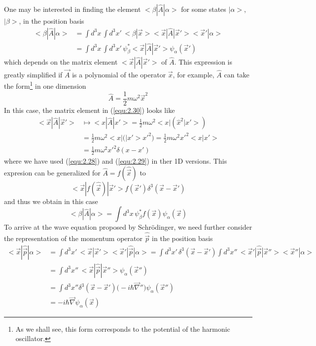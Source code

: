 One may be interested in finding the element
$<\beta|\hat{A}|\alpha>$ for some states $|\alpha>$,
$|\beta>$, in the position basis
\begin{align}
  <\beta|\hat{A}|\alpha> &= \int d^3 x\, \int d^3 x'\,
  <\beta|\vec{x}><\vec{x}|\hat{A}|\vec{x}'><\vec{x}'|\alpha>\nonumber\\
  &=\int d^3 x\, \int d^3 x'\,
  \psi_{\beta}^* <\vec{x}|\hat{A}|\vec{x}'>
  \psi_{\alpha}(\vec{x}')
  \label{equ:2.30}
\end{align}
which depends on the matrix element
$<\vec{x}|\hat{A}|\vec{x}'>$ of $\hat{A}$. This expression
is greatly simplified if $\vec{A}$ is a polynomial of the
operator $\vec{x}$, for example, $\hat{A}$ can take the
form\footnote{As we shall see, this form corresponds to the
potential of the harmonic oscillator.}
in one dimension
\begin{equation}
  \hat{A} = \frac{1}{2} m \omega^2 \vec{x}^2
  \label{equ:2.31}
\end{equation}
In this case, the matrix element in (\ref{equ:2.30}) looks
like
\begin{align*}
  <\vec{x}|\hat{A}|\vec{x}'> &\mapsto <x|\hat{A}|x'> =
  \frac{1}{2} m \omega^2 <x|(\hat{x}^2|x'>) \\
  &=
  \frac{1}{2}m\omega^2 <x|(|x'>x'^2) = \frac{1}{2}m\omega^2
  x'^2<x|x'>\\
  &=
  \frac{1}{2}m\omega^2 x'^2 \delta(x-x')
\end{align*}
where we have used (\ref{equ:2.28}) and (\ref{equ:2.29}) in
ther 1D versions. This expresion can be generalized for
$\hat{A} = f(\hat{\vec{x}})$ to
\begin{equation}
  <\vec{x}|f(\hat{\vec{x}})|\vec{x}'> f(\vec{x}')\delta^3
  (\vec{x}-\vec{x}')
  \label{equ:2.33}
\end{equation}
and thus we obtain in this case
\begin{equation}
  <\beta|\hat{A}|\alpha> = \int d^3x \, \psi_{\beta}^*
  f(\vec{x}) \psi_{\alpha}(\vec{x})
  \label{equ:2.34}
\end{equation}
To arrive at the wave equation proposed by Schrödinger, we
need further consider the representation of the momentum
operator $\hat{\vec{p}}$ in the position basis
\begin{align}
  <\vec{x}|\hat{\vec{p}}|\alpha> &=
  \int d^3 x' \, <\vec{x}|\vec{x}'>
  <\vec{x}'|\hat{\vec{p}}|\alpha> = 
  \int d^3 x' \, \delta^3(\vec{x}-\vec{x}')
  \int d^3 x'' \, <\vec{x}'|\hat{\vec{p}}|\vec{x}''>
  <\vec{x}''|\alpha> \nonumber\\
  &=
  \int d^3 x'' \, <\vec{x}|\hat{\vec{p}}|\vec{x}''>
  \psi_{\alpha}(\vec{x}'')\nonumber\\
  &=
  \int d^3 x'' \delta^3(\vec{x}-\vec{x}') \bigl(-i\hbar
  \vec{\nabla}''\bigr) \psi_{\alpha}(\vec{x}'')\nonumber\\ 
  &=
  -i\hbar \vec{\nabla} \psi_{\alpha}(\vec{x})
  \label{equ:2.35}
\end{align}
